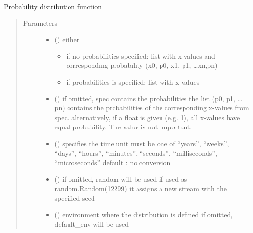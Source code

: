 \documentclass[letterpaper,10pt,english]{sphinxmanual}
\begin{document}
\begin{fulllineitems}
\label{\detokenize{Reference:salabim.Pdf}}
Probability distribution function
\begin{quote}\begin{description}
\item[{Parameters}] \leavevmode\begin{itemize}
\item {} 
 () \textendash{} 
either
\begin{itemize}
\item {} 
if no probabilities specified: 
list with x-values and corresponding probability
(x0, p0, x1, p1, …xn,pn) 

\item {} 
if probabilities is specified: 
list with x-values

\end{itemize}


\item {} 
 (\sphinxstyleliteralemphasis{, }) \textendash{} if omitted, spec contains the probabilities 
the list (p0, p1, …pn) contains the probabilities of the corresponding
x-values from spec. 
alternatively, if a float is given (e.g. 1), all x-values
have equal probability. The value is not important.

\item {} 
 () \textendash{} specifies the time unit 
must be one of “years”, “weeks”, “days”, “hours”, “minutes”, “seconds”, “milliseconds”, “microseconds” 
default : no conversion 

\item {} 
 () \textendash{} if omitted, random will be used 
if used as random.Random(12299)
it assigns a new stream with the specified seed

\item {} 
 ({\hyperref[\detokenize{Reference:salabim.Environment}]{}}) \textendash{} environment where the distribution is defined 
if omitted, default\_env will be used


\end{itemize}
\end{description}
\end{quote}
\end{fulllineitems}
\end{document}
